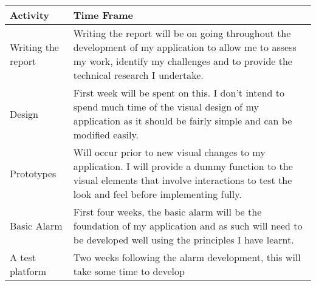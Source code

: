 \begin{longtable}[]{@{}ll@{}}
\toprule
\begin{minipage}[b]{0.20\columnwidth}\raggedright\strut
Activity\strut
\end{minipage} & \begin{minipage}[b]{0.74\columnwidth}\raggedright\strut
Time Frame\strut
\end{minipage}\tabularnewline
\midrule
\endhead
\begin{minipage}[t]{0.20\columnwidth}\raggedright\strut
Writing the report\strut
\end{minipage} & \begin{minipage}[t]{0.74\columnwidth}\raggedright\strut
Writing the report will be on going throughout the development of my
application to allow me to assess my work, identify my challenges and to
provide the technical research I undertake.\strut
\end{minipage}\tabularnewline
\begin{minipage}[t]{0.20\columnwidth}\raggedright\strut
Design\strut
\end{minipage} & \begin{minipage}[t]{0.74\columnwidth}\raggedright\strut
First week will be spent on this. I don't intend to spend much time of
the visual design of my application as it should be fairly simple and
can be modified easily.\strut
\end{minipage}\tabularnewline
\begin{minipage}[t]{0.20\columnwidth}\raggedright\strut
Prototypes\strut
\end{minipage} & \begin{minipage}[t]{0.74\columnwidth}\raggedright\strut
Will occur prior to new visual changes to my application. I will provide
a dummy function to the visual elements that involve interactions to
test the look and feel before implementing fully.\strut
\end{minipage}\tabularnewline
\begin{minipage}[t]{0.20\columnwidth}\raggedright\strut
Basic Alarm\strut
\end{minipage} & \begin{minipage}[t]{0.74\columnwidth}\raggedright\strut
First four weeks, the basic alarm will be the foundation of my
application and as such will need to be developed well using the
principles I have learnt.\strut
\end{minipage}\tabularnewline
\begin{minipage}[t]{0.20\columnwidth}\raggedright\strut
A test platform\strut
\end{minipage} & \begin{minipage}[t]{0.74\columnwidth}\raggedright\strut
Two weeks following the alarm development, this will take some time to
develop\strut
\end{minipage}\tabularnewline
\bottomrule
\end{longtable}

